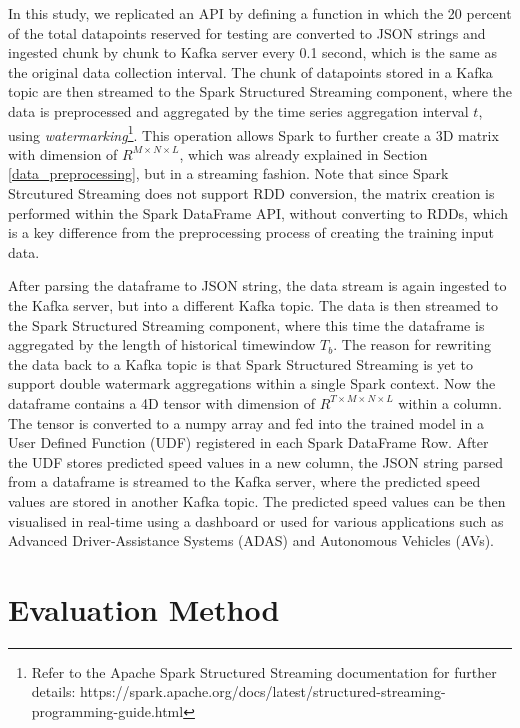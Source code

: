 \documentclass[11pt]{uonthesis}
\begin{document}
In this study, we replicated an API by defining a function in which the 20 percent of the total datapoints reserved for testing are converted to JSON strings and ingested chunk by chunk to Kafka server every 0.1 second, which is the same as the original data collection interval. The chunk of datapoints stored in a Kafka topic are then streamed to the Spark Structured Streaming component, where the data is preprocessed and aggregated by the time series aggregation interval $t$, using \textit{watermarking}\footnote{Refer to the Apache Spark Structured Streaming documentation for further details: https://spark.apache.org/docs/latest/structured-streaming-programming-guide.html}. This operation allows Spark to further create a 3D matrix with dimension of $R^{M{\times}N{\times}L}$, which was already explained in Section \ref{data_preprocessing}, but in a streaming fashion. Note that since Spark Strcutured Streaming does not support RDD conversion, the matrix creation is performed within the Spark DataFrame API, without converting to RDDs, which is a key difference from the preprocessing process of creating the training input data. 

After parsing the dataframe to JSON string, the data stream is again ingested to the Kafka server, but into a different Kafka topic. The data is then streamed to the Spark Structured Streaming component, where this time the dataframe is aggregated by the length of historical timewindow $T_b$. The reason for rewriting the data back to a Kafka topic is that Spark Structured Streaming is yet to support double watermark aggregations within a single Spark context. Now the dataframe contains a 4D tensor with dimension of $R^{T{\times}M{\times}N{\times}L}$ within a column. The tensor is converted to a numpy array and fed into the trained model in a User Defined Function (UDF) registered in each Spark DataFrame Row. After the UDF stores predicted speed values in a new column, the JSON string parsed from a dataframe is streamed to the Kafka server, where the predicted speed values are stored in another Kafka topic. The predicted speed values can be then visualised in real-time using a dashboard or used for various applications such as Advanced Driver-Assistance Systems (ADAS) and Autonomous Vehicles (AVs). 

\section{Evaluation Method}
\end{document}
